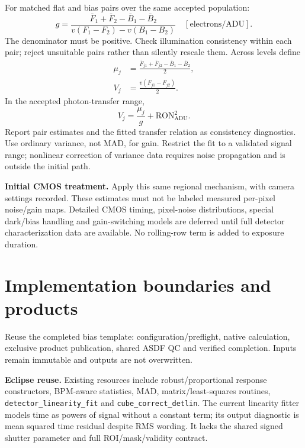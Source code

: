 \documentclass[11pt,a4paper]{article}
\newcommand{\key}[1]{\textbf{\color{ink}#1}}
\newcommand{\nextpage}{\clearpage}
\begin{document}
For matched flat and bias pairs over the same accepted population:
\begin{equation}\boxed{g=\frac{\bar F_1+\bar F_2-\bar B_1-\bar B_2}
{v(F_1-F_2)-v(B_1-B_2)}}\quad[\mathrm{electrons/ADU}].
\end{equation}
The denominator must be positive. Check illumination consistency within each pair; reject unsuitable pairs rather than silently rescale them. Across levels define
\begin{align}
\mu_j&=\frac{\bar F_{j1}+\bar F_{j2}-\bar B_1-\bar B_2}{2},\\
V_j&=\frac{v(F_{j1}-F_{j2})}{2}.
\end{align}
In the accepted photon-transfer range,
\begin{equation}V_j=\frac{\mu_j}{g}+\mathrm{RON}_{\mathrm{ADU}}^2.
\end{equation}
Report pair estimates and the fitted transfer relation as consistency diagnostics. Use ordinary variance, not MAD, for gain. Restrict the fit to a validated signal range; nonlinear correction of variance data requires noise propagation and is outside the initial path.

\key{Initial CMOS treatment.} Apply this same regional mechanism, with camera settings recorded. These estimates must not be labeled measured per-pixel noise/gain maps. Detailed CMOS timing, pixel-noise distributions, special dark/bias handling and gain-switching models are deferred until full detector characterization data are available. No rolling-row term is added to exposure duration.

\nextpage
\section{Implementation boundaries and products}
Reuse the completed bias template: configuration/preflight, native calculation, exclusive product publication, shared ASDF QC and verified completion. Inputs remain immutable and outputs are not overwritten.

\key{Eclipse reuse.} Existing resources include robust/proportional response constructors, BPM-aware statistics, MAD, matrix/least-squares routines, \texttt{detector\_linearity\_fit} and \texttt{cube\_correct\_detlin}. The current linearity fitter models time as powers of signal without a constant term; its output diagnostic is mean squared time residual despite RMS wording. It lacks the shared signed shutter parameter and full ROI/mask/validity contract.
\end{document}
